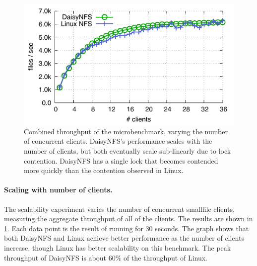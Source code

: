 \begin{figure}[ht]
  \centering
  \includegraphics{daisy-nfs/fig/scale.pdf}
  \caption[Concurrent smallfile performance]%
  {Combined throughput of the  microbenchmark, varying the number
    of concurrent clients. DaisyNFS's performance scales with the number of
    clients, but both eventually scale sub-linearly due to lock contention. DaisyNFS has a single lock that becomes contended more quickly than the contention observed in Linux.}
  \label{fig:eval:scale}
\end{figure}


\paragraph{Scaling with number of clients.}

The scalability experiment varies the number of concurrent smallfile clients,
measuring the aggregate throughput of all of the clients. The results are shown in \cref{fig:eval:scale}. Each data point is the
result of running for 30 seconds. The graph shows that both DaisyNFS and Linux
achieve better performance as the number of clients increase, though Linux has
better scalability on this benchmark. The peak throughput of DaisyNFS is about
60\% of the throughput of Linux.

